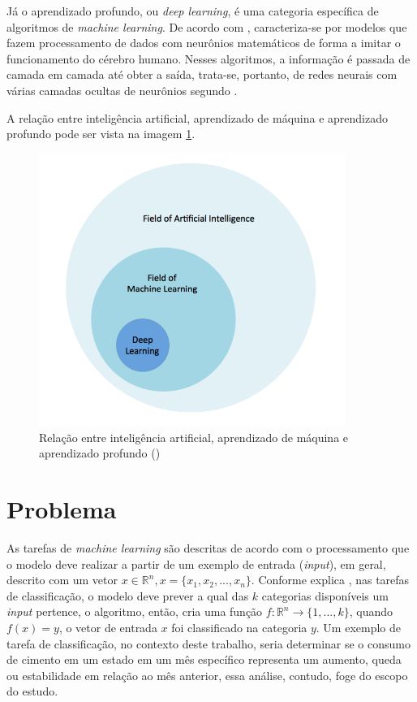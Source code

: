 Já o aprendizado profundo, ou \textit{deep learning}, é uma 
categoria específica de algoritmos de \textit{machine learning}. 
De acordo com \cite{deeplearningbook}, caracteriza-se por 
modelos que fazem processamento de dados com neurônios 
matemáticos de forma a imitar o 
funcionamento do cérebro humano. Nesses algoritmos, a informação
é passada de camada em camada até obter a saída, trata-se, portanto,
de redes neurais com várias camadas ocultas de neurônios 
segundo \cite{d2l}. 

A relação entre inteligência artificial, aprendizado de 
máquina e aprendizado profundo pode ser vista na 
imagem \ref{fig:ia_ml}.

\begin{figure}[H] 
  \includegraphics[width= 10cm]{../figuras/ia_ml.png}
  \caption{Relação entre inteligência artificial, aprendizado de máquina e aprendizado profundo (\cite{dl-oreilly})}
  \label{fig:ia_ml}
\end{figure}

\section{Problema}

As tarefas de \textit{machine learning} são descritas de acordo com o processamento 
que o modelo deve realizar a partir de um exemplo de entrada (\textit{input}), em geral, descrito com 
um vetor $x \in \mathbb{R}^n, x=\{x_1, x_2, ..., x_n\}$.
Conforme explica \cite{Goodfellow-et-al-2016}, nas tarefas de classificação, o modelo deve prever a qual das $k$ categorias 
disponíveis um \textit{input} pertence, o algoritmo, então, cria uma função  
$ f : \mathbb{R}^n \rightarrow \{1,...,k\}$,  quando 
$ f(x) = y$, o vetor de entrada $x$ foi classificado na categoria $y$. Um exemplo 
de tarefa de classificação, no contexto deste trabalho, seria determinar se o 
consumo de cimento em um estado em um mês específico 
representa um aumento, queda ou estabilidade em relação ao mês anterior, essa 
análise, contudo, foge do escopo do estudo.

